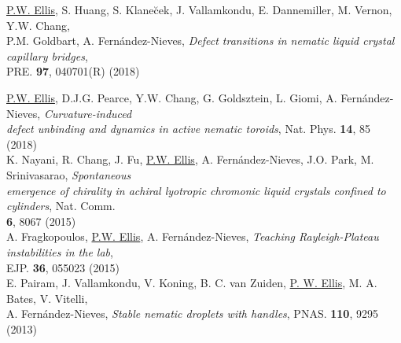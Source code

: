 \documentclass[10pt]{article}
\newenvironment{changemargin}[2]{%
  \list{}{\rightmargin#2\leftmargin#1
    \parsep=0pt\topsep=1pt\partopsep=0pt}
\item[]} {\endlist}
\newenvironment{indentmore}{\begin{changemargin}{10pt}{0cm}}{\end{changemargin}}
\begin{document}
\begin{indentmore}
\underline{P.W. Ellis}, S. Huang, S. Klane\u{c}ek, J. Vallamkondu, E. Dannemiller, M. Vernon, Y.W. Chang, \\ \hspace*{15pt} P.M. Goldbart, A. Fern\'{a}ndez-Nieves, \emph{Defect transitions in nematic liquid crystal capillary bridges},\\ \hspace*{15pt} PRE. {\bf 97}, 040701(R) (2018)\\

\newpage

\underline{P.W. Ellis}, D.J.G. Pearce, Y.W. Chang, G. Goldsztein, L. Giomi, A. Fern\'{a}ndez-Nieves, \emph{Curvature-induced \\ \hspace*{15pt} defect unbinding and dynamics in active nematic toroids}, Nat. Phys. {\bf 14}, 85 (2018) \\

K. Nayani, R. Chang, J. Fu, \underline{P.W. Ellis}, A. Fern\'{a}ndez-Nieves, J.O. Park, M. Srinivasarao, \emph{Spontaneous \\ \hspace*{15pt} emergence of chirality in achiral lyotropic chromonic liquid crystals confined to cylinders}, Nat. Comm. \\ \hspace*{15pt} {\bf 6}, 8067 (2015)  \\

A. Fragkopoulos, \underline{P.W. Ellis}, A. Fern\'{a}ndez-Nieves, \emph{Teaching Rayleigh-Plateau instabilities in the lab}, \\ \hspace*{15pt}EJP. {\bf 36}, 055023 (2015) \\

E. Pairam, J. Vallamkondu, V. Koning, B. C. van Zuiden, \underline{P. W. Ellis}, M. A. Bates, V. Vitelli, \\ \hspace*{15pt}A. Fern\'{a}ndez-Nieves, \emph{Stable nematic droplets with handles}, PNAS. {\bf 110}, 9295 (2013)\\

\end{indentmore}
\end{document}
